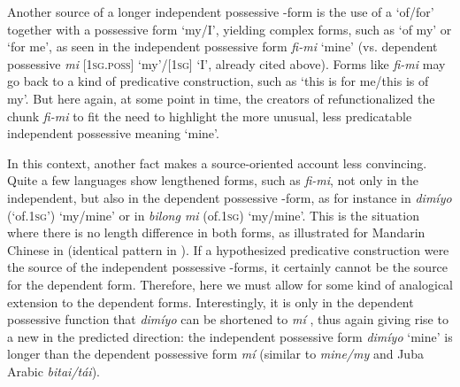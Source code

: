 \documentclass[output=paper]{langsci/langscibook}
\begin{document}
\newpage 
Another source of a longer independent possessive -form is the use of a  ‘of/for’ together with a possessive  form ‘my/I’, yielding complex forms, such as ‘of my’ or ‘for me’, as seen in the  independent possessive form \textit{fi-mi} ‘mine’ (vs. dependent possessive \textit{mi} [\textsc{1sg.poss]} ‘my’/[1\textsc{sg]} ‘I’, already cited above). Forms like \textit{fi-mi} may go back to a kind of predicative construction, such as ‘this is for me/this is of my’. But here again, at some point in time, the creators of  refunctionalized the chunk \textit{fi-mi} to fit the need to highlight the more unusual, less predicatable independent possessive meaning ‘mine’. 


In this context, another fact makes a source-oriented account less convincing. Quite a few  languages show lengthened forms, such as \textit{fi-mi}, not only in the independent, but also in the dependent possessive -form, as for instance in  \textit{dimíyo} (‘of.1\textsc{sg}’) ‘my/mine’ or in  \textit{bilong mi} (of.1\textsc{sg}) ‘my/mine’. This is the situation where there is no length difference in both forms, as illustrated for Mandarin  Chinese in  (identical pattern in ). If a hypothesized predicative construction were the source of the independent possessive -forms, it certainly cannot be the source for the dependent form. Therefore, here we must allow for some kind of analogical extension to the dependent forms. Interestingly, it is only in the dependent possessive function that \textit{dimíyo} can be shortened to \textit{mí} \citep{Steinkrüger2013}, thus again giving rise to a new  in the predicted direction: the independent possessive form \textit{dimíyo} ‘mine’ is longer than the dependent possessive form \textit{mí} (similar to  \textit{mine/my} and Juba Arabic \textit{bitai/tái}).
\end{document}
